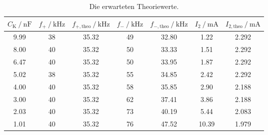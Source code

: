 \begin{table}[H]
  \centering
  \caption{Die erwarteten Theoriewerte.}
  \label{tab:theorietabelle}
  \begin{tabular}{c c c c c c c}
      \toprule
      $C_{\text{K}} \:/\: \si{\nano\farad}$ & $f_+ \:/\: \si{\kilo\hertz}$ & $f_{+, \text{theo}} \:/\: \si{\kilo\hertz}$ & $f_- \:/\: \si{\kilo\hertz}$ & $f_{-, \text{theo}} \:/\: \si{\kilo\hertz}$ & $I_2 \:/\: \si{\milli\ampere}$ & $I_{2,\text{theo}} \:/\: \si{\milli\ampere}$ \\
      \midrule
      9.99 & 38 & 35.32 & 49 & 32.80 & 1.22 & 2.292 \\
      8.00 & 40 & 35.32 & 50 & 33.33 & 1.51 & 2.292 \\
      6.47 & 40 & 35.32 & 50 & 33.95 & 1.87 & 2.292 \\
      5.02 & 38 & 35.32 & 55 & 34.85 & 2.42 & 2.292 \\
      4.00 & 40 & 35.32 & 58 & 35.85 & 2.90 & 2.188 \\
      3.00 & 40 & 35.32 & 62 & 37.41 & 3.86 & 2.188 \\
      2.03 & 40 & 35.32 & 73 & 40.19 & 5.44 & 2.083 \\
      1.01 & 40 & 35.32 & 76 & 47.52 & 10.39 & 1.979 \\
      \bottomrule
  \end{tabular}
\end{table}

\pagebreak